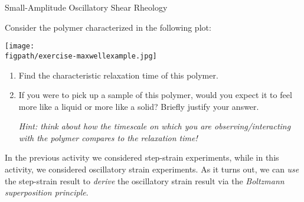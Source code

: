 \begin{activity}[extension]{Small-Amplitude Oscillatory Shear Rheology}
\begin{ctqs}
\begin{enumerate}
		\end{enumerate}
	
\end{ctqs}
	

\clearpage
\begin{exercises}

\exercise Consider the polymer characterized in the following plot:
				
		\centerline{\texttt{[image: \\figpath/exercise-maxwellexample.jpg]}}
		
		\begin{enumerate}
		
			\item Find the characteristic relaxation time of this polymer.
	
					\begin{solution}\end{solution}
	
			\item If you were to pick up a sample of this polymer, would you expect it to feel more like a liquid or more like a solid?  Briefly justify your answer.
	
			\emph{Hint: think about how the timescale on which you are observing/interacting with the polymer compares to the relaxation time!}
	
					\begin{solution}\end{solution}
					
		\end{enumerate}

		\exercise \label{\labelbase:exc:Boltzmann} In the previous activity we considered step-strain experiments, while in this activity, we considered oscillatory strain experiments.  As it turns out, we can \emph{use} the step-strain result to \emph{derive} the oscillatory strain result via the \emph{Boltzmann superposition principle}.
		

\end{exercises}
\end{activity}
